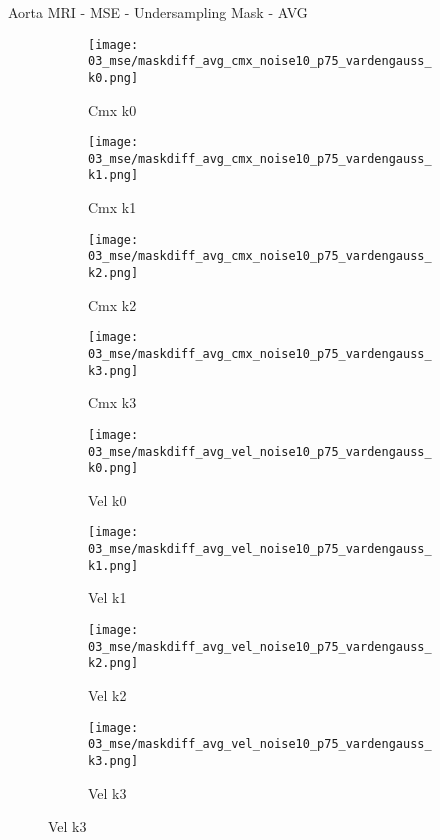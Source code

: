 \documentclass{beamer}
\begin{document}
\begin{frame}{Aorta MRI - MSE - Undersampling Mask - AVG}{}
\begin{figure}
\begin{subfigure}{0.24\textwidth}
\texttt{[image: 03\_mse/maskdiff\_avg\_cmx\_noise10\_p75\_vardengauss\_k0.png]}
\vspace{-20pt}
\caption*{\tiny Cmx k0}
\end{subfigure}
\begin{subfigure}{0.24\textwidth}
\texttt{[image: 03\_mse/maskdiff\_avg\_cmx\_noise10\_p75\_vardengauss\_k1.png]}
\vspace{-20pt}
\caption*{\tiny Cmx k1}
\end{subfigure}
\begin{subfigure}{0.24\textwidth}
\texttt{[image: 03\_mse/maskdiff\_avg\_cmx\_noise10\_p75\_vardengauss\_k2.png]}
\vspace{-20pt}
\caption*{\tiny Cmx k2}
\end{subfigure}
\begin{subfigure}{0.24\textwidth}
\texttt{[image: 03\_mse/maskdiff\_avg\_cmx\_noise10\_p75\_vardengauss\_k3.png]}
\vspace{-20pt}
\caption*{\tiny Cmx k3}
\end{subfigure}

\begin{subfigure}{0.24\textwidth}
\texttt{[image: 03\_mse/maskdiff\_avg\_vel\_noise10\_p75\_vardengauss\_k0.png]}
\vspace{-20pt}
\caption*{\tiny Vel k0}
\end{subfigure}
\begin{subfigure}{0.24\textwidth}
\texttt{[image: 03\_mse/maskdiff\_avg\_vel\_noise10\_p75\_vardengauss\_k1.png]}
\vspace{-20pt}
\caption*{\tiny Vel k1}
\end{subfigure}
\begin{subfigure}{0.24\textwidth}
\texttt{[image: 03\_mse/maskdiff\_avg\_vel\_noise10\_p75\_vardengauss\_k2.png]}
\vspace{-20pt}
\caption*{\tiny Vel k2}
\end{subfigure}
\begin{subfigure}{0.24\textwidth}
\texttt{[image: 03\_mse/maskdiff\_avg\_vel\_noise10\_p75\_vardengauss\_k3.png]}
\vspace{-20pt}
\caption*{\tiny Vel k3}
\end{subfigure}
\end{figure}
\end{frame}
\end{document}
